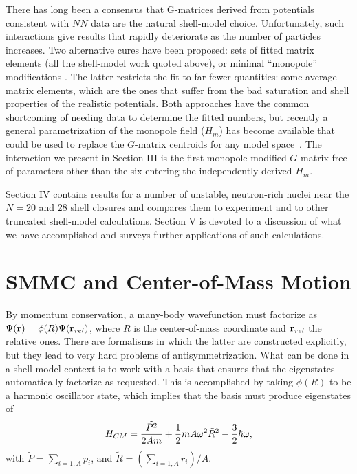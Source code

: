 \begin{multicols}{2}
There has long been a consensus that G-matrices derived from
potentials consistent with $NN$ data \cite{hko95} are the natural shell-model
choice.  Unfortunately, such interactions give results that rapidly
deteriorate as the number of particles increases. Two alternative
cures have been proposed: sets of fitted matrix elements (all the shell-model
work quoted above), or minimal ``monopole'' modifications \cite{acz}.
The latter restricts the fit to far fewer quantities: some average
matrix elements, which are the ones that suffer from the bad
saturation and shell properties of the realistic potentials. Both
approaches have the common shortcoming of needing data to determine
the fitted numbers, but recently a general parametrization of the
monopole field ($H_m$) has become available that could be used to
replace the $G$-matrix centroids for any model space~\cite{dz98}. The
interaction we present in Section III is the first monopole modified
$G$-matrix free of parameters other than the six entering the
independently derived $H_m$.

Section IV contains results for a number of unstable, neutron-rich
nuclei near the $N = 20$ and 28 shell closures and compares them to
experiment and to other truncated shell-model calculations.
Section V is devoted to a discussion of what we have
accomplished and surveys further applications of such
calculations.

\section{SMMC and Center-of-Mass Motion}

By momentum conservation, a many-body wavefunction must factorize as
${\Psi({\bf r})}=\phi(R)\Psi({\bf r}_{rel})$, where $R$ is the center-of-mass
coordinate and ${\bf r}_{rel}$ the relative ones. There are formalisms in
which the latter are constructed explicitly, but they lead to very
hard problems of antisymmetrization. What can be done in a shell-model context
is to work with a basis that ensures that the eigenstates
automatically factorize as requested. This is accomplished
by taking $\phi(R)$ to be a
harmonic oscillator state, which implies that the basis must
produce eigenstates of
\begin{equation}
H_{CM} = {\tilde {P^2}\over{2 A m}} + {1\over{2}} m A
\omega^2 \tilde R^2 - {3\over{2}}\hbar\omega,
\end{equation}
with $\tilde {P}=\sum_{i=1,A} p_i$, and $\tilde {R}=(\sum_{i=1,A} r_i)/A$.


\end{multicols}
